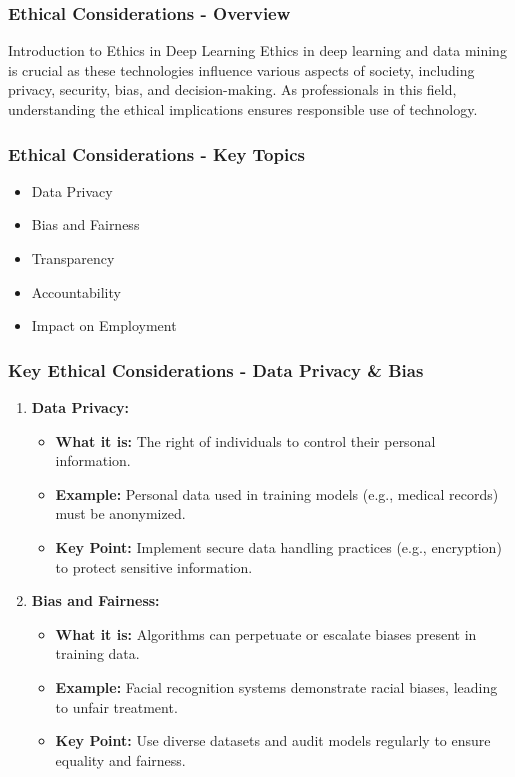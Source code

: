 \documentclass[aspectratio=169]{beamer}
\begin{document}
\begin{frame}[fragile]
    \frametitle{Ethical Considerations - Overview}
    \begin{block}{Introduction to Ethics in Deep Learning}
        Ethics in deep learning and data mining is crucial as these technologies influence various aspects of society, including privacy, security, bias, and decision-making. As professionals in this field, understanding the ethical implications ensures responsible use of technology.
    \end{block}
\end{frame}

\begin{frame}[fragile]
    \frametitle{Ethical Considerations - Key Topics}
    \begin{itemize}
        \item Data Privacy
        \item Bias and Fairness
        \item Transparency
        \item Accountability
        \item Impact on Employment
    \end{itemize}
\end{frame}

\begin{frame}[fragile]
    \frametitle{Key Ethical Considerations - Data Privacy & Bias}
    \begin{enumerate}
        \item \textbf{Data Privacy:}
        \begin{itemize}
            \item \textbf{What it is:} The right of individuals to control their personal information.
            \item \textbf{Example:} Personal data used in training models (e.g., medical records) must be anonymized.
            \item \textbf{Key Point:} Implement secure data handling practices (e.g., encryption) to protect sensitive information.
        \end{itemize}
        
        \item \textbf{Bias and Fairness:}
        \begin{itemize}
            \item \textbf{What it is:} Algorithms can perpetuate or escalate biases present in training data.
            \item \textbf{Example:} Facial recognition systems demonstrate racial biases, leading to unfair treatment.
            \item \textbf{Key Point:} Use diverse datasets and audit models regularly to ensure equality and fairness.
        \end{itemize}
    \end{enumerate}
\end{frame}
\end{document}

